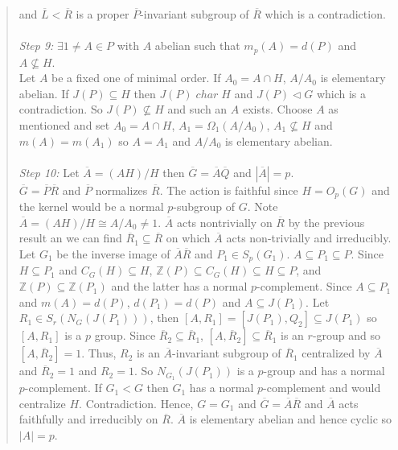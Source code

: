 \begin{quote}
and ${\overline L} < {\overline R}$ is a proper ${\overline P}$-invariant subgroup of
${\overline R}$ which is a contradiction.
\\
\\
\emph{Step 9:} $\exists 1 \ne A \in P$ with $A$ abelian such that $m_p(A)= d(P)$ and
$A \nsubseteq H$.
\\
Let $A$ be a fixed one of minimal order.  If $A_0= A \cap H$,
$A/A_0$ is elementary abelian.  If $J(P) \subseteq H$ then $J(P) \; char \; H$ and
$J(P) \lhd G$ which is a contradiction.  So $J(P) \nsubseteq H$ and such an $A$ exists.
Choose $A$ as mentioned and set $A_0= A \cap H$,  $A_1= \Omega_1(A/A_0)$, $A_1 \nsubseteq H$
and $m(A)= m(A_1)$ so $A= A_1$ and $A/A_0$ is elementary abelian.
\\
\\
\emph{Step 10:}  Let ${\overline A}= (AH)/H$ then $
{\overline G} = {\overline A} {\overline Q} $ and
$|{\overline A} |=p$.
\\
${\overline G}= {\overline P} {\overline R}$ and
${\overline P}$ normalizes
${\overline R}$.  The action is faithful since $H=O_p(G)$ and the kernel would be a normal
$p$-subgroup of $G$.  Note ${\overline A}= (AH)/H \cong A/A_0 \ne 1$.
${\overline A}$ acts nontrivially on
${\overline R}$ by the previous result an we can find
$ {\overline R}_1 \subseteq {\overline R}$ on which ${\overline A}$ acts non-trivially and
irreducibly.  Let $G_1$ be the inverse image of
$ {\overline A} {\overline R} $ and $P_1 \in S_p(G_1)$.   $A \subseteq P_1 \subseteq P$.
Since $H \subseteq P_1$ and
$C_G(H) \subseteq H$, 
${\mathbb Z}(P) \subseteq C_G(H) \subseteq H \subseteq P$, and
${\mathbb Z}(P) \subseteq {\mathbb Z}(P_1)$ and the latter has a 
normal $p$-complement.  Since
$A \subseteq P_1$ and $m(A)= d(P)$, $d(P_1)=  d(P)$ and
$A \subseteq J(P_1 )$.  Let $R_1 \in S_r(N_G(J(P_1 )))$, then
$[A, R_1 ]= [J(P_1 ), Q_2] \subseteq J(P_1 )$ so
$[A, R_1]$ is a $p$ group.  Since
$ {\overline R}_2 \subseteq {\overline R}_1 $,
$ [A, {\overline R}_2] \subseteq {\overline R}_1 $ is an $r$-group
and so
$ [A, {\overline R}_2] =1$.   Thus, $R_2$ is an ${\overline A}$-invariant
subgroup of ${\overline R}_1$ centralized by
${\overline A}$ and ${\overline R}_2 =1$ and $R_2=1$.  So $N_{G_1}(J(P_1 ))$ is a 
$p$-group and has a
normal $p$-complement. If $G_1 < G$ then $G_1$ has a 
normal $p$-complement and would centralize $H$.   Contradiction.  Hence,
$G = G_1$ and
$ {\overline G} = {\overline A} {\overline R} $
and
$ {\overline A} $ acts faithfully and irreducibly on
${\overline R}$.
$ {\overline A} $ is elementary abelian and hence cyclic so $|A|= p$.

\end{quote}
